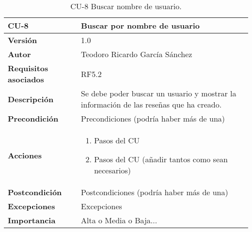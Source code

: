\begin{table}[p]
	\centering
	\begin{tabularx}{\linewidth}{ p{} p{} }
		\toprule
		\textbf{CU-8}    & \textbf{Buscar por nombre de usuario}\\
		\toprule
		\textbf{Versión}              & 1.0    \\
		\textbf{Autor}                & Teodoro Ricardo García Sánchez \\
		\textbf{Requisitos asociados} & RF5.2 \\
		\textbf{Descripción}          & Se debe poder buscar un usuario y mostrar la información de las reseñas que ha creado. \\
		\textbf{Precondición}         & Precondiciones (podría haber más de una) \\
		\textbf{Acciones}             &
		\begin{enumerate}
			\def\labelenumi{\arabic{enumi}.}
			\tightlist
			\item Pasos del CU
			\item Pasos del CU (añadir tantos como sean necesarios)
		\end{enumerate}\\
		\textbf{Postcondición}        & Postcondiciones (podría haber más de una) \\
		\textbf{Excepciones}          & Excepciones \\
		\textbf{Importancia}          & Alta o Media o Baja... \\
		\bottomrule
	\end{tabularx}
	\caption{CU-8 Buscar nombre de usuario.}
\end{table}

